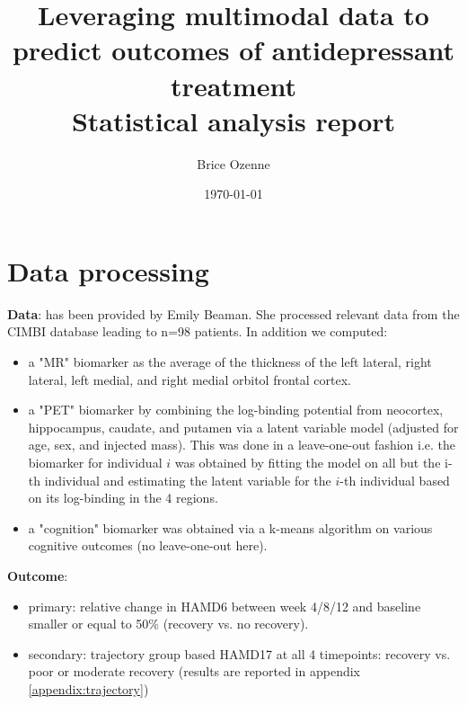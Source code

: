 \documentclass[12pt]{article}
\author{Brice Ozenne}
\date{\today}
\title{Leveraging multimodal data to predict outcomes of antidepressant treatment\\\medskip
\large Statistical analysis report}
\begin{document}
\maketitle

\section{Data processing}
\label{sec:orgc714337}

\textbf{Data}: has been provided by Emily Beaman. She processed relevant data
from the CIMBI database leading to n=98 patients. In addition we
computed:
\begin{itemize}
\item a "MR" biomarker as the average of the thickness of the left
lateral, right lateral, left medial, and right medial orbitol
frontal cortex.
\item a "PET" biomarker by combining the log-binding potential from
neocortex, hippocampus, caudate, and putamen via a latent variable
model (adjusted for age, sex, and injected mass). This was done
in a leave-one-out fashion i.e. the biomarker for individual \(i\)
was obtained by fitting the model on all but the i-th individual and
estimating the latent variable for the \(i\)-th individual based on
its log-binding in the 4 regions.
\item a "cognition" biomarker was obtained via a k-means algorithm on
various cognitive outcomes (no leave-one-out here).
\end{itemize}

\noindent \textbf{Outcome}:
\begin{itemize}
\item primary: relative change in HAMD6 between week 4/8/12 and baseline smaller or equal to 50\% (recovery vs. no recovery).
\item secondary: trajectory group based HAMD17 at all 4 timepoints: \newline recovery vs. poor or moderate recovery \newline (results are reported in appendix \ref{appendix:trajectory})
\end{itemize}

\bigskip
\end{document}
